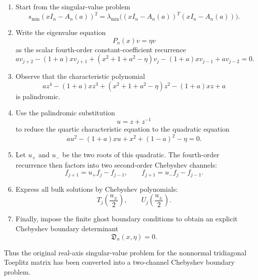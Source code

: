\documentclass[11pt]{amsart}
\numberwithin{equation}{section}
\begin{document}
\begin{enumerate}
\item Start from the singular-value problem
\[
        s_{\min}(xI_n-A_n(a))^2
        =
        \lambda_{\min}\bigl((xI_n-A_n(a))^T(xI_n-A_n(a))\bigr).
\]

\item Write the eigenvalue equation
\[
        P_n(x)v=\eta v
\]
as the scalar fourth-order constant-coefficient recurrence
\[
        a v_{j+2}
        -(1+a)xv_{j+1}
        +(x^2+1+a^2-\eta)v_j
        -(1+a)xv_{j-1}
        +a v_{j-2}=0.
\]

\item Observe that the characteristic polynomial
\[
        a z^4
        -(1+a)xz^3
        +(x^2+1+a^2-\eta)z^2
        -(1+a)xz
        +a
\]
is palindromic.

\item Use the palindromic substitution
\[
        u=z+z^{-1}
\]
to reduce the quartic characteristic equation to the quadratic equation
\[
        a u^2-(1+a)xu+x^2+(1-a)^2-\eta=0.
\]

\item Let \(u_+\) and \(u_-\) be the two roots of this quadratic.  The
fourth-order recurrence then factors into two second-order Chebyshev
channels:
\[
        f_{j+1}=u_+ f_j-f_{j-1},
        \qquad
        f_{j+1}=u_- f_j-f_{j-1}.
\]

\item Express all bulk solutions by Chebyshev polynomials:
\[
        T_j\!\left(\frac{u_\pm}{2}\right),
        \qquad
        U_j\!\left(\frac{u_\pm}{2}\right).
\]

\item Finally, impose the finite ghost boundary conditions to obtain an
explicit Chebyshev boundary determinant
\[
        \mathfrak D_n(x,\eta)=0.
\]
\end{enumerate}

Thus the original real-axis singular-value problem for the nonnormal
tridiagonal Toeplitz matrix has been converted into a two-channel Chebyshev
boundary problem.
\end{document}
